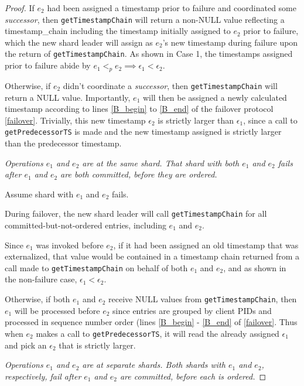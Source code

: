 \begin{proof}
If $e_2$ had been assigned a timestamp prior to failure and coordinated some \textit{successor}, then \texttt{getTimestampChain} will return a non-NULL value reflecting a timestamp\_chain including the timestamp initially assigned to $e_2$ prior to failure, which the new shard leader will assign as $e_2$'s new timestamp during failure upon the return of \texttt{getTimestampChain}. As shown in Case 1, the timestamps assigned prior to failure abide by $e_1 <_p e_2 \implies \epsilon_1 < \epsilon_2$.

Otherwise, if $e_2$ didn't coordinate a \textit{successor}, then \texttt{getTimestampChain} will return a NULL value. Importantly, $e_1$ will then be assigned a newly calculated timestamp according to lines \ref{B_begin} to \ref{B_end} of the failover protocol \ref{failover}. Trivially, this new timestamp $\epsilon_2$ is strictly larger than $\epsilon_1$, since a call to \texttt{getPredecessorTS} is made and the new timestamp assigned is strictly larger than the predecessor timestamp.

 \textit{Operations $e_1$ and $e_2$ are at the same shard. That shard with both $e_1$ and $e_2$ fails after $e_1$ and $e_2$ are both \textit{committed}, before they are \textit{ordered}.}

Assume shard with $e_1$ and $e_2$ fails.

During failover, the new shard leader will call \texttt{getTimestampChain} for all committed-but-not-ordered entries, including $e_1$ and $e_2$.

Since $e_1$ was invoked before $e_2$, if it had been assigned an old timestamp that was externalized, that value would be contained in a timestamp chain returned from a call made to \texttt{getTimestampChain} on behalf of both $e_1$ and $e_2$, and as shown in the non-failure case, $\epsilon_1 < \epsilon_2$. 

Otherwise, if both $e_1$ and $e_2$ receive NULL values from \texttt{getTimestampChain}, then $e_1$ will be processed before $e_2$ since entries are grouped by client PIDs and processed in sequence number order (lines \ref{B_begin} - \ref{B_end} of \ref{failover}. Thus when $e_2$ makes a call to \texttt{getPredecessorTS}, it will read the already assigned $\epsilon_1$ and pick an $\epsilon_2$ that is strictly larger.

 \textit{Operations $e_1$ and $e_2$ are at separate shards. Both shards with $e_1$ and $e_2$, respectively, fail after $e_1$ and $e_2$ are \textit{committed}, before each is \textit{ordered}.}


\end{proof}
